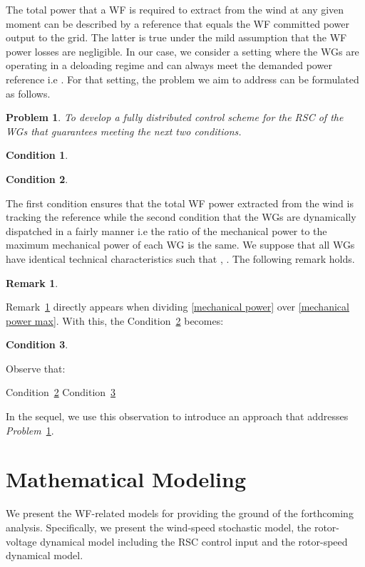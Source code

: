 \documentclass[letterpaper, 10 pt, conference]{ieeeconf}
\newtheorem{cond}{\textnormal{\textbf{Condition}}}
\newtheorem{problem}{\textnormal{\textbf{Problem}}}
\newtheorem{remark}{\textnormal{\textbf{Remark}}}
\begin{document}
The total power that a WF is required to extract from the wind at any given moment can be described by a reference  that equals the WF committed power output to the grid. The latter is true under the mild assumption that the WF power losses are negligible. In our case, we consider a setting where the  WGs are operating in a deloading regime and can always meet the demanded power reference i.e . For that setting, the problem we aim to address can be formulated as follows.
\begin{problem}
To develop a fully distributed control scheme for the RSC of the WGs that guarantees meeting the next two conditions.
\label{Problem1}
\end{problem}
\begin{cond}

\label{cond1}
\end{cond}
\begin{cond}

\label{cond2}
 \end{cond}
The first condition ensures that the total WF power extracted from the wind is tracking the reference while the second condition that the WGs are dynamically dispatched in a fairly manner i.e the ratio of the mechanical power to the maximum mechanical power of each WG is the same. We suppose that all WGs have identical technical characteristics such that , . The following remark holds. \vspace{2mm} 
\begin{remark}

\label{remark1}
\end{remark}
Remark~\ref{remark1} directly appears when dividing \eqref{mechanical power} over \eqref{mechanical power max}. 
With this, the Condition~\ref{cond2} becomes:
\begin{cond}

\label{cond3}
\end{cond}
Observe that:
\begin{center}
Condition~\ref{cond2} Condition~\ref{cond3}
\end{center} 
In the sequel, we use this observation to introduce an approach that addresses \textit{Problem}~\ref{Problem1}.









\section{Mathematical Modeling}
We present the WF-related models for providing the ground of the forthcoming analysis.  Specifically, we present the wind-speed stochastic model, the rotor-voltage dynamical model including the RSC control input and the rotor-speed dynamical model.
\end{document}
